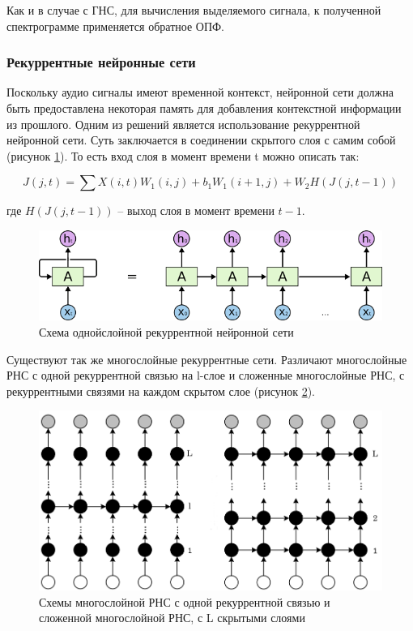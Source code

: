 Как и в случае с ГНС, для вычисления выделяемого сигнала, к полученной спектрограмме применяется обратное ОПФ.

\subsubsection{Рекуррентные нейронные сети}

Поскольку аудио сигналы имеют временной контекст, нейронной сети должна быть предоставлена некоторая память для добавления контекстной информации из прошлого. Одним из решений является использование рекуррентной нейронной сети. Суть заключается в соединении скрытого слоя с самим собой (рисунок \ref{anal:rnn}). То есть вход слоя в момент времени t можно описать так:

\begin{equation}
J(j,t) = \sum X(i,t) W_1(i,j) + b_1 W_1(i+1, j) + W_2 H( J(j, t-1) )
\end{equation}

где $H(J(j,t-1))$ -- выход слоя в момент времени $t-1$. 

\begin{figure}
	\centering
	\includegraphics[width=\textwidth]{inc/img/rnn-simple.png}
	\caption{Схема однойслойной рекуррентной нейронной сети}
	\label{anal:rnn}
\end{figure}

Существуют так же многослойные рекуррентные сети. Различают многослойные РНС с одной рекуррентной связью на l-слое и сложенные многослойные РНС, с рекуррентными связями на каждом скрытом слое (рисунок \ref{anal:drnn}).

\begin{figure}
	\centering
	\includegraphics[width=\textwidth]{inc/img/rdnn.png}
	\caption{Схемы многослойной РНС с одной рекуррентной связью и сложенной многослойной РНС, с L скрытыми слоями}
	\label{anal:drnn}
\end{figure}

